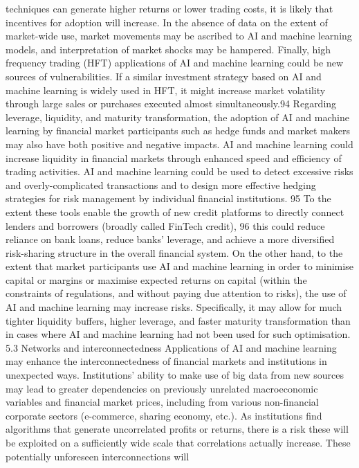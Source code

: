 \documentclass[]{article}
\begin{document}
techniques can generate higher returns or lower trading costs, it is
likely that incentives for adoption will increase. In the absence of
data on the extent of market-wide use, market movements may be ascribed
to AI and machine learning models, and interpretation of market shocks
may be hampered. Finally, high frequency trading (HFT) applications of
AI and machine learning could be new sources of vulnerabilities. If a
similar investment strategy based on AI and machine learning is widely
used in HFT, it might increase market volatility through large sales or
purchases executed almost simultaneously.94 Regarding leverage,
liquidity, and maturity transformation, the adoption of AI and machine
learning by financial market participants such as hedge funds and market
makers may also have both positive and negative impacts. AI and machine
learning could increase liquidity in financial markets through enhanced
speed and efficiency of trading activities. AI and machine learning
could be used to detect excessive risks and overly-complicated
transactions and to design more effective hedging strategies for risk
management by individual financial institutions. 95 To the extent these
tools enable the growth of new credit platforms to directly connect
lenders and borrowers (broadly called FinTech credit), 96 this could
reduce reliance on bank loans, reduce banks' leverage, and achieve a
more diversified risk-sharing structure in the overall financial system.
On the other hand, to the extent that market participants use AI and
machine learning in order to minimise capital or margins or maximise
expected returns on capital (within the constraints of regulations, and
without paying due attention to risks), the use of AI and machine
learning may increase risks. Specifically, it may allow for much tighter
liquidity buffers, higher leverage, and faster maturity transformation
than in cases where AI and machine learning had not been used for such
optimisation. 5.3 Networks and interconnectedness Applications of AI and
machine learning may enhance the interconnectedness of financial markets
and institutions in unexpected ways. Institutions' ability to make use
of big data from new sources may lead to greater dependencies on
previously unrelated macroeconomic variables and financial market
prices, including from various non-financial corporate sectors
(e-commerce, sharing economy, etc.). As institutions find algorithms
that generate uncorrelated profits or returns, there is a risk these
will be exploited on a sufficiently wide scale that correlations
actually increase. These potentially unforeseen interconnections will
\end{document}
